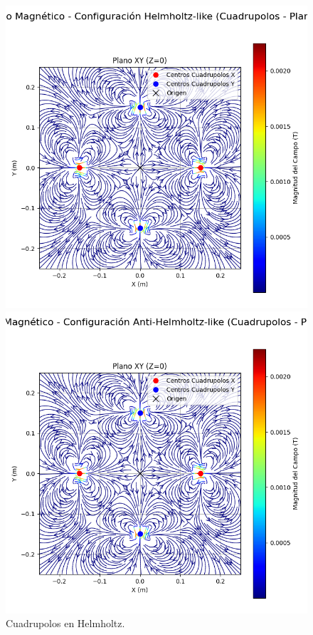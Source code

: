 \begin{figure}[H] %
    \centering
    \begin{minipage}[b]{0.48\textwidth} %
        \includegraphics[width=\linewidth, trim={0cm 2cm 0cm 1cm}, clip]{Sections/Figures/helmholtz_quadrupoles_xy_field.png} %
        \caption{Cuadrupolos en Helmholtz.}
        \label{fig:helmholtz_quadrupoles_xy_field}
    \end{minipage}
    \hfill
    \begin{minipage}[b]{0.48\textwidth} %
        \includegraphics[width=\linewidth, trim={0cm 2cm 0cm 1cm}, clip]{Sections/Figures/antihelmholtz_quadrupoles_xy_field.png} %

\end{minipage}
\end{figure}

